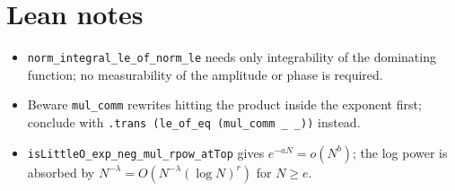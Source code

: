 \documentclass[11pt]{article}
\begin{document}
\section{Lean notes}
\begin{itemize}
\item \texttt{norm\_integral\_le\_of\_norm\_le} needs only integrability of the dominating function;
no measurability of the amplitude or phase is required.
\item Beware \texttt{mul\_comm} rewrites hitting the product inside the exponent first; conclude with
\texttt{.trans (le\_of\_eq (mul\_comm \_ \_))} instead.
\item \texttt{isLittleO\_exp\_neg\_mul\_rpow\_atTop} gives $e^{-aN}=o(N^b)$; the log power is absorbed
by $N^{-\lambda}=O(N^{-\lambda}(\log N)^r)$ for $N\ge e$.
\end{itemize}
\end{document}
